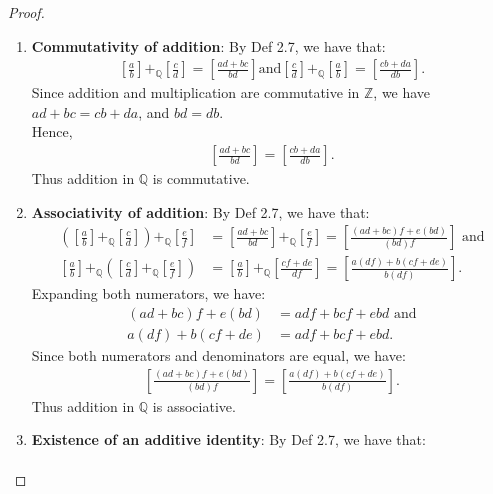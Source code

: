 \documentclass[11pt]{article}
\begin{document}
\noindent\begin{proof} 
    \item
\begin{enumerate}[label=(\alph*)]
    \item \textbf{Commutativity of addition}:
    By Def 2.7, we have that:
    \begin{align*}
    \left[\frac{a}{b}\right]+_{\mathbb{Q}} \left[\frac{c}{d}\right] = \left[\frac{ad + bc}{bd}\right] \text{and}
    \left[\frac{c}{d}\right]+_{\mathbb{Q}} \left[\frac{a}{b}\right] = \left[\frac{cb + da}{db}\right].
    \end{align*}
    Since addition and multiplication are commutative in $\mathbb{Z}$, we have $ad + bc = cb + da$, and $bd = db$. \\
    Hence,
    \begin{align*}
    \left[\frac{ad + bc}{bd}\right] = \left[\frac{cb + da}{db}\right].
    \end{align*}
    Thus addition in $\mathbb{Q}$ is commutative.
    \item \textbf{Associativity of addition}:
    By Def 2.7, we have that:
    \begin{align*}
    \left(\left[\frac{a}{b}\right]+_{\mathbb{Q}}\left[\frac{c}{d}\right] \right)+_{\mathbb{Q}}\left[\frac{e}{f}\right] &= \left[\frac{ad + bc}{bd}\right] +_{\mathbb{Q}} \left[\frac{e}{f}\right] = \left[\frac{(ad + bc)f + e(bd)}{(bd)f}\right] \text{ and} \\
    \left[\frac{a}{b}\right]+_{\mathbb{Q}}\left( \left[\frac{c}{d}\right] +_{\mathbb{Q}} \left[\frac{e}{f       }\right]\right) &= \left[\frac{a}{b}\right] +_{\mathbb{Q}} \left[\frac{cf + de}{df}\right] = \left[\frac{a(df) + b(cf + de)}{b(df)}\right].
    \end{align*}
    Expanding both numerators, we have:
    \begin{align*}
    (ad + bc)f + e(bd) &= adf + bcf + ebd \text{ and} \\
    a(df) + b(cf + de) &= adf + bcf + ebd.
    \end{align*}
    Since both numerators and denominators are equal, we have:
    \begin{align*}
    \left[\frac{(ad + bc)f + e(bd)}{(bd)f}\right] = \left[\frac{a(df) + b(cf + de)}{b(df)}\right].
    \end{align*}
    Thus addition in $\mathbb{Q}$ is associative.
    \item \textbf{Existence of an additive identity}:
    By Def 2.7, we have that:
    \begin{align*}

\end{align*}
\end{enumerate}
\end{proof}
\end{document}
